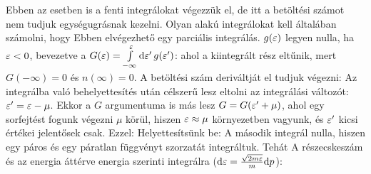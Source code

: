     
    Ebben az esetben is a fenti integrálokat végezzük el, de itt a betöltési számot nem tudjuk egységugrásnak kezelni. Olyan alakú integrálokat kell általában számolni, hogy 
    Ebben elvégezhető egy parciális integrálás. $g(\varepsilon)$ legyen nulla, ha $\varepsilon<0$, bevezetve a $G(\varepsilon)=\int\limits_{-\infty}^{\varepsilon}\mathrm{d}\varepsilon'\,g(\varepsilon')$:
    ahol a kiintegrált rész eltűnik, mert $G(-\infty)=0$ és $n(\infty)=0$. A betöltési szám deriváltját el tudjuk végezni:
    Az integrálba való behelyettesítés után célszerű lesz eltolni az integrálási változót: $\varepsilon'=\varepsilon-\mu$. Ekkor a $G$ argumentuma is más lesz $G=G(\varepsilon'+\mu)$, ahol egy sorfejtést fogunk végezni $\mu$ körül, hiszen $\varepsilon\approx \mu$ környezetben vagyunk, és $\varepsilon'$ kicsi értékei jelentősek csak. Ezzel:
    Helyettesítsünk be:
    A második integrál nulla, hiszen egy páros és egy páratlan függvényt szorzatát integráltuk. Tehát
    A részecskeszám és az energia áttérve energia szerinti integrálra ($\mathrm{d} \varepsilon=\frac{\sqrt{2m\varepsilon}}{m}\mathrm{d} p$):
